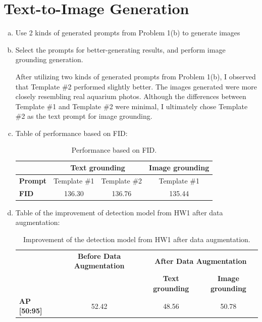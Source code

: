 \documentclass[10pt,a4paper]{article}
\begin{document}
\section*{Text-to-Image Generation}
\begin{enumerate}[(a)]
\item Use 2 kinds of generated prompts from Problem 1(b) to generate images


\item Select the prompts for better-generating results, and perform image grounding generation.

After utilizing two kinds of generated prompts from Problem 1(b), I observed that Template \#2 performed slightly better. The images generated were more closely resembling real aquarium photos. Although the differences between Template \#1 and Template \#2 were minimal, I ultimately chose Template \#2 as the text prompt for image grounding.


\item Table of performance based on FID:
\begin{table}[h!]
\centering
\caption{Performance based on FID.}
\begin{tabular}{lccc}
\toprule
 & \multicolumn{2}{c}{\textbf{Text grounding}} & \textbf{Image grounding} \\
\midrule
\textbf{Prompt} & Template \#1 & Template \#2 & Template \#1 \\
\textbf{FID} & 136.30 & 136.76 & 135.44 \\
\bottomrule
\end{tabular}
\end{table}
    
\item Table of the improvement of detection model from HW1 after data augmentation:

\begin{table}[h!]

\centering
\caption{Improvement of the detection model from HW1 after data augmentation.}
\begin{tabular}{lccc}
\toprule
 & \textbf{Before Data Augmentation} & \multicolumn{2}{c}{\textbf{After Data Augmentation}} \\
\cmidrule{3-4}
 & & \textbf{Text grounding} & \textbf{Image grounding} \\
\midrule
\textbf{AP [50:95]} & 52.42 & 48.56 & 50.78 \\
\bottomrule
\end{tabular}
\end{table}



\end{enumerate}
\end{document}
